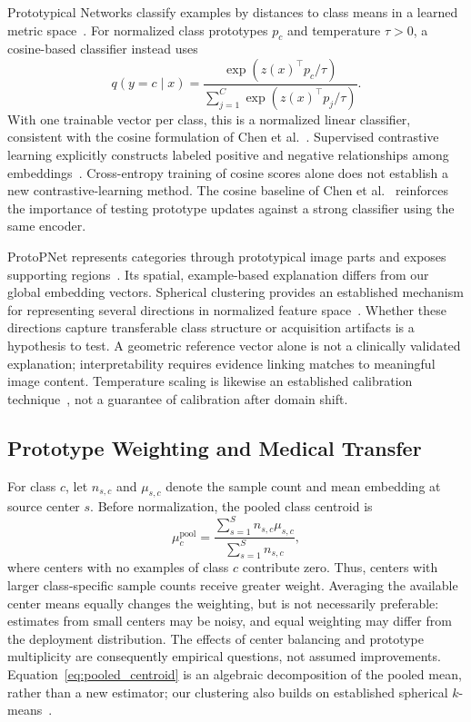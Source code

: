 Prototypical Networks classify examples by distances to class means in a learned metric space~\cite{snell2017prototypical}. For normalized class prototypes $p_c$ and temperature $\tau>0$, a cosine-based classifier instead uses
\begin{equation}
    q(y=c\mid x)=\frac{\exp(z(x)^\top p_c/\tau)}
    {\sum_{j=1}^{C}\exp(z(x)^\top p_j/\tau)}.
    \label{eq:prototype_classifier}
\end{equation}
With one trainable vector per class, this is a normalized linear classifier, consistent with the cosine formulation of Chen et al.~\cite{chen2019closer}. Supervised contrastive learning explicitly constructs labeled positive and negative relationships among embeddings~\cite{khosla2020supcon}. Cross-entropy training of cosine scores alone does not establish a new contrastive-learning method. The cosine baseline of Chen et al.~\cite{chen2019closer} reinforces the importance of testing prototype updates against a strong classifier using the same encoder.

ProtoPNet represents categories through prototypical image parts and exposes supporting regions~\cite{chen2019protopnet}. Its spatial, example-based explanation differs from our global embedding vectors. Spherical clustering provides an established mechanism for representing several directions in normalized feature space~\cite{dhillon2001spherical}. Whether these directions capture transferable class structure or acquisition artifacts is a hypothesis to test. A geometric reference vector alone is not a clinically validated explanation; interpretability requires evidence linking matches to meaningful image content. Temperature scaling is likewise an established calibration technique~\cite{guo2017calibration}, not a guarantee of calibration after domain shift.

\subsection{Prototype Weighting and Medical Transfer}
For class $c$, let $n_{s,c}$ and $\mu_{s,c}$ denote the sample count and mean embedding at source center $s$. Before normalization, the pooled class centroid is
\begin{equation}
    \mu_c^{\mathrm{pool}}=
    \frac{\sum_{s=1}^{S}n_{s,c}\mu_{s,c}}
    {\sum_{s=1}^{S}n_{s,c}},
    \label{eq:pooled_centroid}
\end{equation}
where centers with no examples of class $c$ contribute zero. Thus, centers with larger class-specific sample counts receive greater weight. Averaging the available center means equally changes the weighting, but is not necessarily preferable: estimates from small centers may be noisy, and equal weighting may differ from the deployment distribution. The effects of center balancing and prototype multiplicity are consequently empirical questions, not assumed improvements. Equation~\ref{eq:pooled_centroid} is an algebraic decomposition of the pooled mean, rather than a new estimator; our clustering also builds on established spherical $k$-means~\cite{dhillon2001spherical}.

